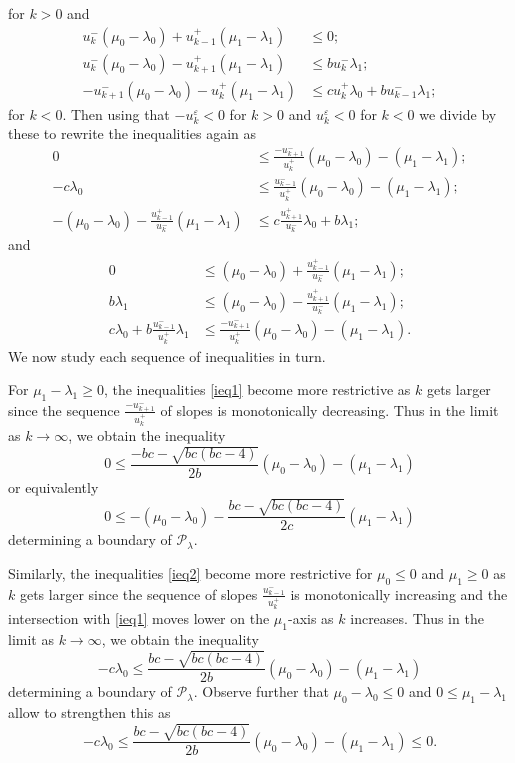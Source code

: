 \documentclass{amsart}
\numberwithin{theorem}{section}
\newcommand{\cP}{\mathcal{P}}
\begin{document}
  for $k>0$ and
  \begin{align*}
    u_k^-(\mu_0-\lambda_0)+u_{k-1}^+(\mu_1-\lambda_1) &\le 0;\\
    u_k^-(\mu_0-\lambda_0)-u_{k+1}^+(\mu_1-\lambda_1) &\le bu_k^-\lambda_1;\\
    -u_{k+1}^-(\mu_0-\lambda_0)-u_k^+(\mu_1-\lambda_1) &\le cu_k^+\lambda_0+bu_{k-1}^-\lambda_1;
  \end{align*}
  for $k<0$.
  Then using that $-u_k^\varepsilon<0$ for $k>0$ and $u_k^\varepsilon<0$ for $k<0$ we divide by these to rewrite the inequalities again as
  \begin{align}
    \label{ieq1} 0 & \le \frac{-u_{k+1}^-}{u_k^+}(\mu_0-\lambda_0)-(\mu_1-\lambda_1);\\
    \label{ieq2} -c\lambda_0 & \le \frac{u_{k-1}^-}{u_k^+}(\mu_0-\lambda_0)-(\mu_1-\lambda_1);\\
    \label{ieq3} -(\mu_0-\lambda_0)-\frac{u_{k-1}^+}{u_k^-}(\mu_1-\lambda_1) &\le c\frac{u_{k+1}^+}{u_k^-}\lambda_0+b\lambda_1;
  \end{align}
  and
  \begin{align}
    \label{ieq4} 0 &\le (\mu_0-\lambda_0)+\frac{u_{k-1}^+}{u_k^-}(\mu_1-\lambda_1);\\
    \label{ieq5} b\lambda_1 &\le (\mu_0-\lambda_0)-\frac{u_{k+1}^+}{u_k^-}(\mu_1-\lambda_1);\\
    \label{ieq6} c\lambda_0+b\frac{u_{k-1}^-}{u_k^+}\lambda_1 &\le \frac{-u_{k+1}^-}{u_k^+}(\mu_0-\lambda_0)-(\mu_1-\lambda_1).
  \end{align}
  We now study each sequence of inequalities in turn.

  For $\mu_1-\lambda_1\ge 0$, the inequalities \eqref{ieq1} become more restrictive as $k$ gets larger since the sequence $\frac{-u_{k+1}^-}{u_k^+}$ of slopes is monotonically decreasing.
  Thus in the limit as $k\to\infty$, we obtain the inequality 
  \[ 0 \le \frac{-bc-\sqrt{bc(bc-4)}}{2b}(\mu_0-\lambda_0)-(\mu_1-\lambda_1) \]
  or equivalently
  \[ 0 \le -(\mu_0-\lambda_0)-\frac{bc-\sqrt{bc(bc-4)}}{2c}(\mu_1-\lambda_1) \]
  determining a boundary of $\cP_\lambda$.

  Similarly, the inequalities \eqref{ieq2} become more restrictive for $\mu_0\le0$ and $\mu_1\ge0$ as $k$ gets larger since the sequence of slopes $\frac{u_{k-1}^-}{u_k^+}$ is monotonically increasing and the intersection with \eqref{ieq1} moves lower on the $\mu_1$-axis as $k$ increases.
  Thus in the limit as $k\to\infty$, we obtain the inequality
  \[ -c\lambda_0 \le \frac{bc-\sqrt{bc(bc-4)}}{2b}(\mu_0-\lambda_0)-(\mu_1-\lambda_1) \]
  determining a boundary of $\cP_\lambda$.
  Observe further that $\mu_0-\lambda_0 \le 0$ and $0 \le \mu_1-\lambda_1$ allow to strengthen this as
  \[ -c\lambda_0 \le \frac{bc-\sqrt{bc(bc-4)}}{2b}(\mu_0-\lambda_0)-(\mu_1-\lambda_1) \le 0. \]
\end{document}
